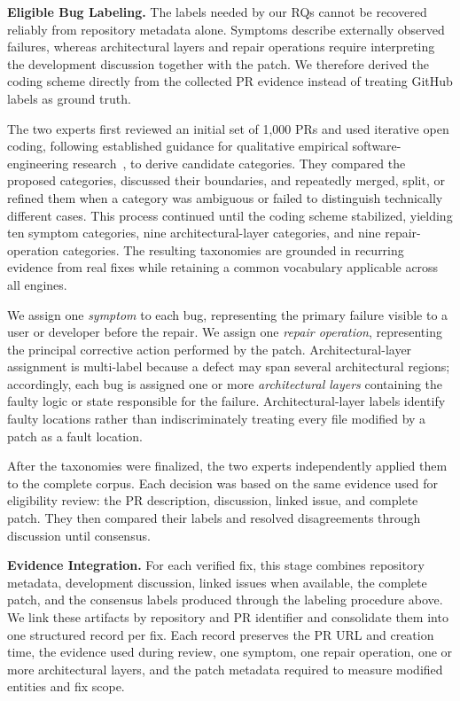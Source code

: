 \textbf{Eligible Bug Labeling.} The labels needed by our RQs cannot be recovered reliably from repository metadata alone. Symptoms describe externally observed failures, whereas architectural layers and repair operations require interpreting the development discussion together with the patch. We therefore derived the coding scheme directly from the collected PR evidence instead of treating GitHub labels as ground truth.

The two experts first reviewed an initial set of 1,000 PRs and used iterative open coding, following established guidance for qualitative empirical software-engineering research~\cite{seaman1999qualitative}, to derive candidate categories. They compared the proposed categories, discussed their boundaries, and repeatedly merged, split, or refined them when a category was ambiguous or failed to distinguish technically different cases. This process continued until the coding scheme stabilized, yielding ten symptom categories, nine architectural-layer categories, and nine repair-operation categories. The resulting taxonomies are grounded in recurring evidence from real fixes while retaining a common vocabulary applicable across all engines.

We assign one \emph{symptom} to each bug, representing the primary failure visible to a user or developer before the repair. We assign one \emph{repair operation}, representing the principal corrective action performed by the patch. Architectural-layer assignment is multi-label because a defect may span several architectural regions; accordingly, each bug is assigned one or more \emph{architectural layers} containing the faulty logic or state responsible for the failure. Architectural-layer labels identify faulty locations rather than indiscriminately treating every file modified by a patch as a fault location.

After the taxonomies were finalized, the two experts independently applied them to the complete corpus. Each decision was based on the same evidence used for eligibility review: the PR description, discussion, linked issue, and complete patch. They then compared their labels and resolved disagreements through discussion until consensus.

\textbf{Evidence Integration.} For each verified fix, this stage combines repository metadata, development discussion, linked issues when available, the complete patch, and the consensus labels produced through the labeling procedure above. We link these artifacts by repository and PR identifier and consolidate them into one structured record per fix. Each record preserves the PR URL and creation time, the evidence used during review, one symptom, one repair operation, one or more architectural layers, and the patch metadata required to measure modified entities and fix scope.

